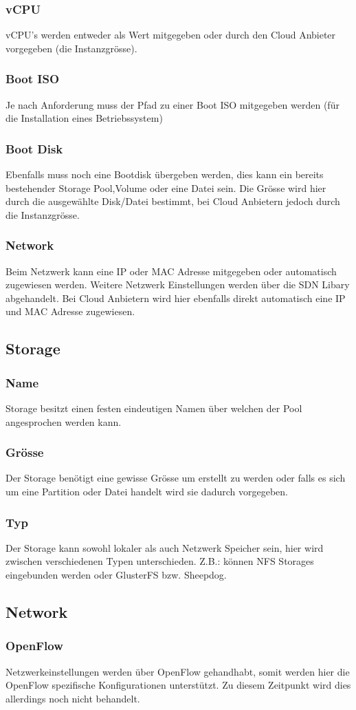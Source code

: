 \documentclass[11pt]{scrartcl}
\begin{document}
\subsubsection{vCPU}
vCPU's werden entweder als Wert mitgegeben oder durch den Cloud Anbieter vorgegeben (die Instanzgrösse). 

\subsubsection{Boot ISO}
Je nach Anforderung muss der Pfad zu einer Boot ISO mitgegeben werden (für die Installation eines 
Betriebssystem) 

\subsubsection{Boot Disk}
Ebenfalls muss noch eine Bootdisk übergeben werden, dies kann ein bereits 
bestehender Storage Pool,Volume oder eine Datei sein.
Die Grösse wird hier durch die ausgewählte Disk/Datei bestimmt, bei Cloud 
Anbietern jedoch durch die Instanzgrösse.

\subsubsection{Network}
Beim Netzwerk kann eine IP oder MAC Adresse mitgegeben oder automatisch zugewiesen 
werden.
Weitere Netzwerk Einstellungen werden über die SDN Libary abgehandelt.
Bei Cloud Anbietern wird hier ebenfalls direkt automatisch eine IP und MAC 
Adresse zugewiesen.

\subsection{Storage}
\subsubsection{Name}
Storage besitzt einen festen eindeutigen Namen über welchen der Pool angesprochen 
werden kann.
\subsubsection{Grösse}
Der Storage benötigt eine gewisse Grösse um erstellt zu werden oder falls es 
sich um eine Partition oder Datei handelt wird sie dadurch vorgegeben.

\subsubsection{Typ}
Der Storage kann sowohl lokaler als auch Netzwerk Speicher sein, hier wird 
zwischen verschiedenen Typen unterschieden.
Z.B.: können NFS Storages eingebunden werden oder GlusterFS bzw. Sheepdog.



\subsection{Network}
\subsubsection{OpenFlow}
Netzwerkeinstellungen werden über OpenFlow gehandhabt, somit werden hier die 
OpenFlow spezifische Konfigurationen unterstützt.
Zu diesem Zeitpunkt wird dies allerdings noch nicht behandelt.
\end{document}
